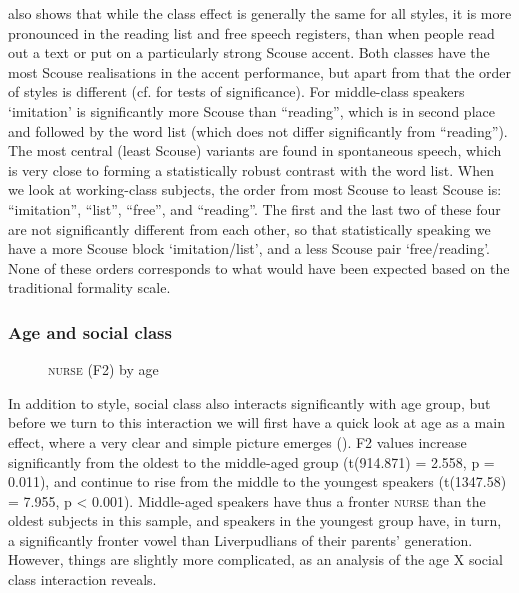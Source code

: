  also shows that while the class effect is generally the same for all styles, it is more pronounced in the reading list and free speech registers, than when people read out a text or put on a particularly strong Scouse accent.
Both classes have the most Scouse realisations in the accent performance, but apart from that the order of styles is different (cf.  for tests of significance).
For middle-class speakers `imitation' is significantly more Scouse than ``reading'', which is in second place and followed by the word list (which does not differ significantly from ``reading'').
The most central (least Scouse) variants are found in spontaneous speech, which is very close to forming a statistically robust contrast with the word list.
When we look at working-class subjects, the order from most Scouse to least Scouse is: ``imitation'', ``list'', ``free'', and ``reading''.
The first and the last two of these four are not significantly different from each other, so that statistically speaking we have a more Scouse block `imitation/list', and a less Scouse pair `free/reading'.
None of these orders corresponds to what would have been expected based on the traditional formality scale.

\subsubsection{Age and social class}
\label{sec.prod.res.vow.nurse.f2.styleage}

\begin{figure}
	
		\resizebox{0.5\linewidth}{!}{} 
	\caption{\textsc{nurse} (F2) by age}
	\label{fig.box.f2.nurse.tot}
\end{figure}

In addition to style, social class also interacts significantly with age group, but before we turn to this interaction we will first have a quick look at age as a main effect, where a very clear and simple picture emerges ().
F2 values increase significantly from the oldest to the middle-aged group (t(914.871) = 2.558, p = 0.011), and continue to rise from the middle to the youngest speakers (t(1347.58) = 7.955, p < 0.001).
Middle-aged speakers have thus a fronter \textsc{nurse} than the oldest subjects in this sample, and speakers in the youngest group have, in turn, a significantly fronter vowel than Liverpudlians of their parents' generation.
However, things are slightly more complicated, as an analysis of the age X social class interaction reveals.

